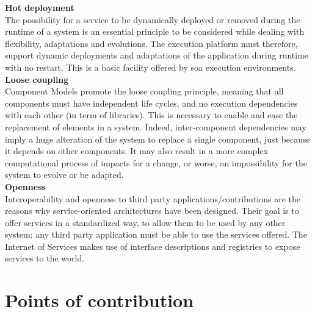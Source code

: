 {\bf Hot deployment}\\
The possibility for a service to be dynamically deployed or removed during the runtime of a system is an essential principle to be considered while dealing with flexibility, adaptations and evolutions. The execution platform must therefore, support dynamic deployments and adaptations of the application during runtime with no restart. This is a basic facility offered by \gls{soa} execution environments.\\

{\bf Loose coupling}\\
Component Models promote the loose coupling principle, meaning that all components must have independent life cycles, and no execution dependencies with each other (in term of libraries). This is necessary to enable and ease the replacement of elements in a system. Indeed, inter-component dependencies may imply a huge alteration of the system to replace a single component, just because it depends on other components. It may also result in a more complex computational process of impacts for a change, or worse, an impossibility for the system to evolve or be adapted.\\

{\bf Openness}\\
Interoperability and openness to third party applications/contributions are the reasons why service-oriented architectures have been designed. Their goal is to offer services in a standardized way, to allow them to be used by any other system: any third party application must be able to use the services offered. The Internet of Services makes use of interface descriptions and registries to expose services to the world.


\section{Points of contribution}

